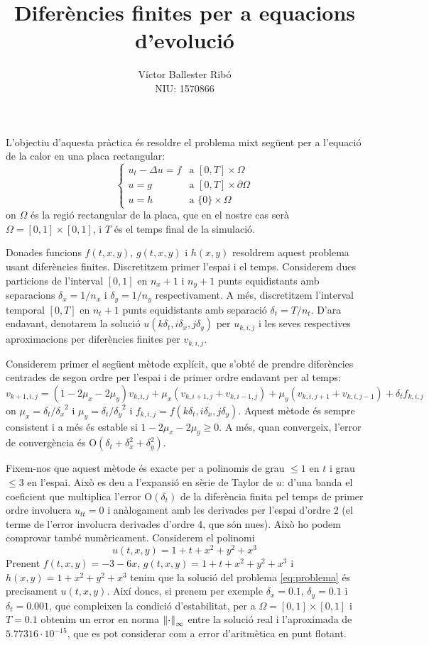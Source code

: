 \documentclass[10pt,a4paper]{article}
\title{\bfseries\Large Diferències finites per a equacions d'evolució}
\author{Víctor Ballester Ribó\\NIU: 1570866}
\date{\parbox{\linewidth}{\centering
  Integració numèrica d'equacions en derivades parcials\endgraf
  Grau en Matemàtiques\endgraf
  Universitat Autònoma de Barcelona\endgraf
  Juny de 2023}}
\renewcommand{\O}[1]{\mathrm{O}\left(#1\right)} %
\theoremstyle{definition}
\theoremstyle{remark}
\begin{document}
\maketitle
L'objectiu d'aquesta pràctica és resoldre el problema mixt següent per a l'equació de la calor en una placa rectangular:
\begin{equation}\label{eq:problema}
  \begin{cases}
    u_t-\Delta u = f & \text{a } [0,T]\times\Omega         \\
    u=g              & \text{a } [0,T]\times\partial\Omega \\
    u=h              & \text{a } \{0\}\times \Omega
  \end{cases}
\end{equation}
on $\Omega$ és la regió rectangular de la placa, que en el nostre cas serà $\Omega = [0,1]\times[0,1]$, i $T$ és el temps final de la simulació.

Donades funcions $f(t,x,y)$, $g(t,x,y)$ i $h(x,y)$ resoldrem aquest problema usant diferències finites. Discretitzem primer l'espai i el temps. Considerem dues particions de l'interval $[0,1]$ en $n_x+1$ i $n_y+1$ punts equidistants amb separacions $\delta_x=1/n_x$ i $\delta_y=1/n_y$ respectivament. A més, discretitzem l'interval temporal $[0,T]$ en $n_t+1$ punts equidistants amb separació $\delta_t=T/n_t$. D'ara endavant, denotarem la solució $u(k\delta_t, i\delta_x, j\delta_y)$ per $u_{k,i,j}$ i les seves respectives aproximacions per diferències finites per $v_{k,i,j}$.

Considerem primer el següent mètode explícit, que s'obté de prendre diferències centrades de segon ordre per l'espai i de primer ordre endavant per al temps:
$$
  v_{k+1,i,j} = (1-2\mu_x - 2\mu_y) v_{k,i,j} + \mu_x (v_{k,i+1,j} + v_{k,i-1,j}) + \mu_y (v_{k,i,j+1} + v_{k,i,j-1}) + \delta_t f_{k,i,j}
$$
on $\mu_x = \delta_t/{\delta_x}^2$ i $\mu_y = \delta_t/{\delta_y}^2$ i $f_{k,i,j}=f(k\delta_t, i\delta_x, j\delta_y)$. Aquest mètode és sempre consistent i a més és estable si $1- 2\mu_x -2 \mu_y \geq 0$. A més, quan convergeix, l'error de convergència és $\O{\delta_t + \delta_x^2 + \delta_y^2}$.

Fixem-nos que aquest mètode és exacte per a polinomis de grau $\leq 1$ en $t$ i grau $\leq 3$ en l'espai. Això es deu a l'expansió en sèrie de Taylor de $u$: d'una banda el coeficient que multiplica l'error $\O{\delta_t}$ de la diferència finita pel temps de primer ordre involucra $u_{tt}=0$ i anàlogament amb les derivades per l'espai d'ordre 2 (el terme de l'error involucra derivades d'ordre 4, que són nu\lgem es). Això ho podem comprovar també numèricament. Considerem el polinomi
$$u(t,x,y)=1+t+x^2+y^2+x^3$$
Prenent $f(t,x,y)= -3-6x$, $g(t,x,y)=1+t+x^2+y^2+x^3$ i $h(x,y)=1+x^2+y^2+x^3$ tenim que la solució del problema \eqref{eq:problema} és precisament $u(t,x,y)$. Així doncs, si prenem per exemple $\delta_x=0.1$, $\delta_y=0.1$ i $\delta_t=0.001$, que compleixen la condició d'estabilitat, per a $\Omega = [0,1]\times[0,1]$ i $T=0.1$ obtenim un error en norma $\norm{\cdot}_\infty$ entre la solució real i l'aproximada de $5.77316\cdot 10^{-15}$, que es pot considerar com a error d'aritmètica en punt flotant.\vspace*{0.25cm}
\end{document}

